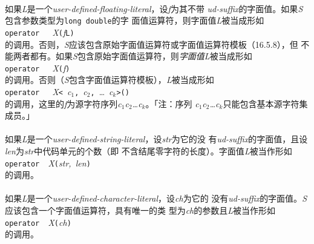 \paragraph{}
如果\textit{L}是一个\textit{user-defined-floating-literal}，设\textit{f}为其不带
\textit{ud-suffix}的字面值。如果\textit{S}包含参数类型为\texttt{long double}的字
面值运算符，则字面值\textit{L}被当成形如                                      \\
\mbox{\qquad \texttt{operator \qdbl\qdbl}\ \
  \textit{X}\texttt{(}\textit{f}\texttt{L)}}                                  \\
的调用。否则，\textit{S}应该包含原始字面值运算符或字面值运算符模板（16.5.8），但
不能两者都有。如果\textit{S}包含原始字面值运算符，则\textit{字面值L}被当成形如\\
\mbox{\qquad \texttt{operator \qdbl\qdbl}\ \
  \textit{X}\texttt{(\qdbl}\textit{f}\texttt{\qdbl)}}                         \\
的调用。否则（\textit{S}包含字面值运算符模板），\textit{L}被当成形如          \\
\mbox{\qquad \texttt{operator \qdbl\qdbl}\ \ \textit{X}\texttt{<}
  \textit{\qsgl c$_1$\qsgl}\texttt{,} \textit{\qsgl c$_2$\qsgl}\texttt{,} \ldots
  \textit{\qsgl c$_k$\qsgl}\texttt{>()}}                                      \\
的调用，这里的\textit{f}为源字符序列\textit{c$_1$c$_2$\ldots c$_k$}。「注：序列
\textit{c$_1$c$_2$\ldots c$_k$}只能包含基本源字符集成员。」

\paragraph{}
如果\textit{L}是一个\textit{user-defined-string-literal}，设\textit{str}为它的没
有\textit{ud-suffix}的字面值，且设\textit{len}为\textit{str}中代码单元的个数（即
不含结尾零字符的长度）。字面值\textit{L}被当作形如                            \\
\mbox{\qquad\texttt{operator \qdbl\qdbl}\
  \textit{X}\texttt{(}\textit{str, len}\texttt{)}}                            \\
的调用。

\paragraph{}
如果\textit{L}是一个\textit{user-defined-character-literal}，设\textit{ch}为它的
没有\textit{ud-suffix}的字面值。\textit{S}应该包含一个字面值运算符，具有唯一的类
型为\textit{ch}的参数且\textit{L}被当作形如                                   \\
\mbox{\qquad\texttt{operator \qdbl\qdbl}\
  \textit{X}\texttt{(}\textit{ch}\texttt{)}}                                  \\
的调用。

